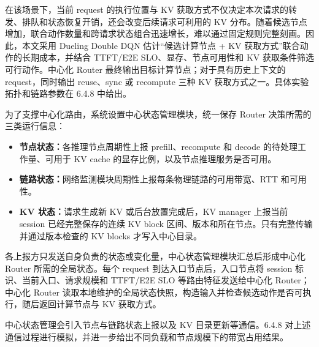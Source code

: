 在该场景下，当前 request 的执行位置与 KV 获取方式不仅决定本次请求的转发、排队和状态恢复开销，还会改变后续请求可利用的 KV 分布。随着候选节点增加，联合动作数量和跨请求状态组合迅速增长，难以通过固定规则完整刻画。因此，本文采用 Dueling Double DQN 估计“候选计算节点 + KV 获取方式”联合动作的长期成本，并结合 TTFT/E2E SLO、显存、节点可用性和 KV 获取条件筛选可行动作。中心化 Router 最终输出目标计算节点；对于具有历史上下文的 request，同时输出 reuse、sync 或 recompute 三种 KV 获取方式之一。具体实验拓扑和链路参数在 6.4.8 中给出。

为了支撑中心化路由，系统设置中心状态管理模块，统一保存 Router 决策所需的三类运行信息：
\begin{itemize}
    \item \textbf{节点状态：}各推理节点周期性上报 prefill、recompute 和 decode 的待处理工作量、可用于 KV cache 的显存比例，以及节点推理服务是否可用。
    \item \textbf{链路状态：}网络监测模块周期性上报每条物理链路的可用带宽、RTT 和可用性。
    \item \textbf{KV 状态：}请求生成新 KV 或后台放置完成后，KV manager 上报当前 session 已经完整保存的连续 KV block 区间、版本和所在节点。只有完整传输并通过版本检查的 KV blocks 才写入中心目录。
\end{itemize}
各上报方只发送自身负责的状态或变化量，中心状态管理模块汇总后形成中心化 Router 所需的全局状态。每个 request 到达入口节点后，入口节点将 session 标识、当前入口、请求规模和 TTFT/E2E SLO 等路由特征发送给中心化 Router；中心化 Router 读取本地维护的全局状态快照，构造输入并检查候选动作是否可执行，随后返回计算节点与 KV 获取方式。

中心状态管理会引入节点与链路状态上报以及 KV 目录更新等通信。6.4.8 对上述通信过程进行模拟，并进一步给出不同负载和节点规模下的带宽占用结果。

